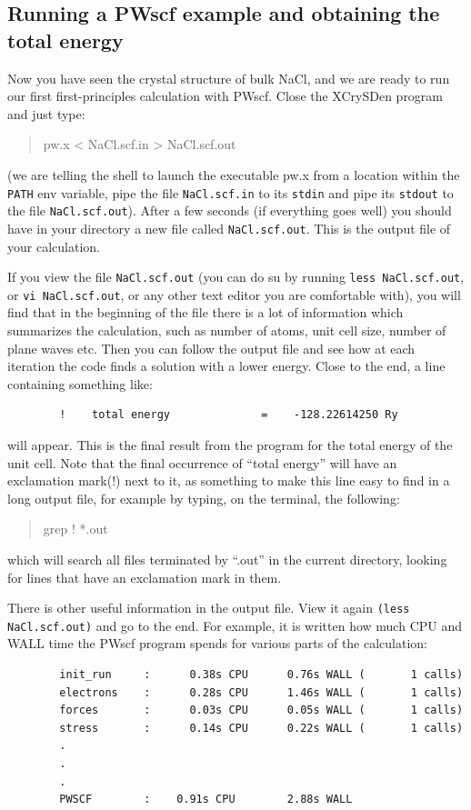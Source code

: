 \documentclass[12pt]{article}
\newcommand{\code}[1]{
\begin{quotation}
  #1 
\end{quotation}
}
\begin{document}
    \subsection {Running a PWscf example and obtaining the total energy} 

    Now you have seen the crystal structure of bulk NaCl, and we are ready to run our
    first first-principles calculation with PWscf. Close the XCrySDen program and just
    type:
    \code{pw.x < NaCl.scf.in > NaCl.scf.out}

    (we are telling the shell to launch the executable pw.x from a location within the
    {\tt PATH} env variable, pipe the file {\tt NaCl.scf.in} to its {\tt stdin} and pipe
    its {\tt stdout} to the file {\tt NaCl.scf.out}).
    After a few seconds (if everything goes well) you should have in your directory a new
    file called {\tt NaCl.scf.out}.
    This is the output file of your calculation.

    If you view the file {\tt NaCl.scf.out} (you can do su by running {\tt less NaCl.scf.out}, or {\tt vi NaCl.scf.out}, or any other text editor you are comfortable with), you will find that
    in the beginning of the file there is a lot of information which summarizes the
    calculation, such as number of atoms, unit cell size, number of plane waves etc.
    Then you can follow the output file and see how at each iteration the code finds a
    solution with a lower energy. Close to the end, a line containing something like:
    \begin{verbatim}
        !    total energy              =    -128.22614250 Ry
    \end{verbatim}
    will appear.
    This is the final result from the program for the total energy of the unit cell.
    Note that the final occurrence of “total energy” will have an exclamation mark(!)
    next to it, as something to make this line easy to find in a long output file, for
    example by typing, on the terminal, the following:
    \code{grep ! *.out}
    which will search all files terminated by “.out” in the current directory, looking
    for lines that have an exclamation mark in them.

    There is other useful information in the output file. View it again
    {\tt (less NaCl.scf.out)} and go to the end.
    For example, it is written how much CPU and WALL time the PWscf program spends for
    various parts of the calculation:
    \begin{verbatim}
        init_run     :      0.38s CPU      0.76s WALL (       1 calls)
        electrons    :      0.28s CPU      1.46s WALL (       1 calls)
        forces       :      0.03s CPU      0.05s WALL (       1 calls)
        stress       :      0.14s CPU      0.22s WALL (       1 calls)
        .
        .
        .
        PWSCF        :    0.91s CPU        2.88s WALL
    \end{verbatim}
\end{document}
